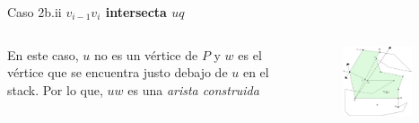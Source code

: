 \documentclass[aspectratio=169,xcolor=dvipsnames, t]{beamer}
\begin{document}
\begin{frame}{Caso 2b.ii}
    \textbf{$v_{i-1}v_{i}$ intersecta $uq$}\\
    \vspace{0.5cm}
    \begin{columns}
    \begin{column}{0.45\textwidth}
    En este caso, $u$ no es un vértice de $P$ y $w$ es el vértice que se encuentra justo debajo de $u$ en el stack. Por lo que, $uw$ es una \textit{arista construida}\\
    \vspace{0.5cm}
    \end{column}
    \begin{column}{0.45\textwidth}  %
    \vspace{-3cm}
        \begin{figure}
            \centering
            \includegraphics[width=0.85\textwidth]{imagenes/Caso2.7a.png}
        \end{figure}
    \end{column}
    \end{columns}
\end{frame}

\end{document}
